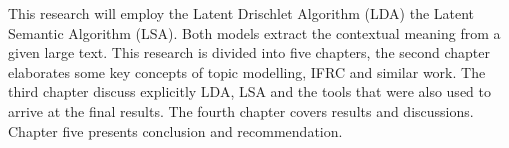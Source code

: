 This research will employ the Latent Drischlet Algorithm (LDA) the Latent Semantic Algorithm (LSA). Both models extract the contextual meaning from a given large text. 
This research is divided into five chapters, the second chapter elaborates some key concepts of topic modelling, IFRC and similar work. The third chapter discuss explicitly LDA, LSA and the tools that were also used to arrive at the final results. The fourth chapter covers results and discussions. Chapter five presents conclusion and recommendation.




